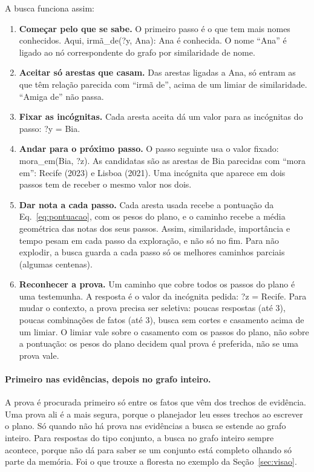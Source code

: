 \documentclass[11pt]{article}
\newcommand{\rel}[1]{\textsf{#1}}
\newcommand{\inc}[1]{\textsf{?#1}}
\begin{document}
A busca funciona assim:
\begin{enumerate}[leftmargin=*,itemsep=2pt]
\item \textbf{Começar pelo que se sabe.} O primeiro passo é o que tem mais
  nomes conhecidos. Aqui, \rel{irmã\_de}(\inc{y}, Ana): Ana é conhecida. O
  nome ``Ana'' é ligado ao nó correspondente do grafo por similaridade de
  nome.
\item \textbf{Aceitar só arestas que casam.} Das arestas ligadas a Ana, só
  entram as que têm relação parecida com ``irmã de'', acima de um limiar de
  similaridade. ``Amiga de'' não passa.
\item \textbf{Fixar as incógnitas.} Cada aresta aceita dá um valor para as
  incógnitas do passo: \inc{y} = Bia.
\item \textbf{Andar para o próximo passo.} O passo seguinte usa o valor
  fixado: \rel{mora\_em}(Bia, \inc{z}). As candidatas são as arestas de Bia
  parecidas com ``mora em'': Recife (2023) e Lisboa (2021). Uma incógnita
  que aparece em dois passos tem de receber o mesmo valor nos dois.
\item \textbf{Dar nota a cada passo.} Cada aresta usada recebe a pontuação
  da Eq.~\eqref{eq:pontuacao}, com os pesos do plano, e o caminho recebe a
  média geométrica das notas dos seus passos. Assim, similaridade, importância e tempo
  pesam em cada passo da exploração, e não só no fim. Para não explodir, a
  busca guarda a cada passo só os melhores caminhos parciais (algumas
  centenas).
\item \textbf{Reconhecer a prova.} Um caminho que cobre todos os passos do
  plano é uma testemunha. A resposta é o valor da incógnita pedida:
  \inc{z} = Recife. Para mudar o contexto, a prova precisa ser seletiva:
  poucas respostas (até 3), poucas combinações de fatos (até 3), busca sem
  cortes e casamento acima de um limiar. O limiar vale sobre o casamento com
  os passos do plano, não sobre a pontuação: os pesos do plano decidem qual
  prova é preferida, não se uma prova vale.
\end{enumerate}

\paragraph{Primeiro nas evidências, depois no grafo inteiro.} A prova é
procurada primeiro só entre os fatos que vêm dos trechos de evidência. Uma
prova ali é a mais segura, porque o planejador leu esses trechos ao escrever
o plano. Só quando não há prova nas evidências a busca se estende ao grafo
inteiro. Para respostas do tipo conjunto, a busca no grafo inteiro sempre
acontece, porque não dá para saber se um conjunto está completo olhando só
parte da memória. Foi o que trouxe a floresta no exemplo da
Seção~\ref{sec:visao}.
\end{document}
